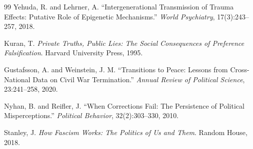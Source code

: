 \documentclass[11pt,a4paper]{article}
\theoremstyle{remark}
\begin{document}
\begin{thebibliography}{99}
Yehuda, R. and Lehrner, A.
``Intergenerational Transmission of Trauma Effects: Putative Role of Epigenetic Mechanisms.''
\textit{World Psychiatry}, 17(3):243--257, 2018.

Kuran, T.
\textit{Private Truths, Public Lies: The Social Consequences of Preference Falsification}.
Harvard University Press, 1995.

Gustafsson, A. and Weinstein, J. M.
``Transitions to Peace: Lessons from Cross-National Data on Civil War Termination.''
\textit{Annual Review of Political Science}, 23:241--258, 2020.

Nyhan, B. and Reifler, J.
``When Corrections Fail: The Persistence of Political Misperceptions.''
\textit{Political Behavior}, 32(2):303--330, 2010.

Stanley, J.
\textit{How Fascism Works: The Politics of Us and Them}.
Random House, 2018.

\end{thebibliography}
\end{document}
